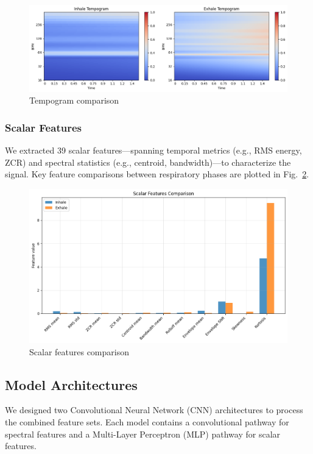\begin{figure}[h!]
\centering
\includegraphics[width=\columnwidth]{figures/tempogram}	
\caption{Tempogram comparison}
\label{fig:tempogram}
\end{figure}

\subsubsection{Scalar Features}

We extracted 39 scalar features---spanning temporal metrics (e.g., RMS energy, ZCR) and spectral statistics (e.g., centroid, bandwidth)---to characterize the signal. Key feature comparisons between respiratory phases are plotted in Fig.~\ref{fig:scalars}.

\begin{figure}[h!]
\centering
\includegraphics[width=0.9\columnwidth]{figures/scalars}	
\caption{Scalar features comparison}
\label{fig:scalars}
\end{figure}

\subsection{Model Architectures}

We designed two Convolutional Neural Network (CNN) architectures to process the combined feature sets. Each model contains a convolutional pathway for spectral features and a Multi-Layer Perceptron (MLP) pathway for scalar features.


